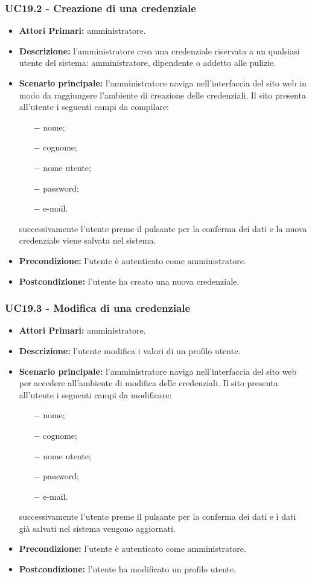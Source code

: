 \subsubsection{ UC19.2 - Creazione di una credenziale}
\begin{itemize}
	\item\textbf{Attori Primari:}
	amministratore.
	\item\textbf{Descrizione:} 
	l'amministratore crea una credenziale riservata a un qualsiasi utente del sistema: amministratore, dipendente o addetto alle pulizie.
	\item\textbf{Scenario principale:} 
	l'amministratore naviga nell'interfaccia del sito web in modo da raggiungere l'ambiente di creazione delle credenziali.
	Il sito presenta all'utente i seguenti campi da compilare:
	\begin{itemize}
		\item[$-$] nome;
		\item[$-$] cognome;
		\item[$-$] nome utente;
		\item[$-$] password;
		\item[$-$] e-mail.
	\end{itemize}
	successivamente l'utente preme il pulsante per la conferma dei dati e la nuova credenziale viene salvata nel sistema.
	\item\textbf{Precondizione:} 
	l'utente è autenticato come amministratore.
	\item\textbf{Postcondizione:}
	l'utente ha creato una nuova credenziale.
\end{itemize}

\subsubsection{ UC19.3 - Modifica di una credenziale}
\begin{itemize}
	\item\textbf{Attori Primari:} 
	amministratore.
	\item\textbf{Descrizione:} 
	l'utente modifica i valori di un profilo utente.
	\item\textbf{Scenario principale:} 
	l'amministratore naviga nell'interfaccia del sito web per accedere all'ambiente di modifica delle credenziali.
	Il sito presenta all'utente i seguenti campi da modificare:
	\begin{itemize}
		\item[$-$] nome;
		\item[$-$] cognome;
		\item[$-$] nome utente;
		\item[$-$] password;
		\item[$-$] e-mail.
	\end{itemize}
	successivamente l'utente preme il pulsante per la conferma dei dati e i dati già salvati nel sistema vengono aggiornati.
	\item\textbf{Precondizione:} 
	l'utente è autenticato come amministratore.
	\item\textbf{Postcondizione:}
	l'utente ha modificato un profilo utente.
\end{itemize}

